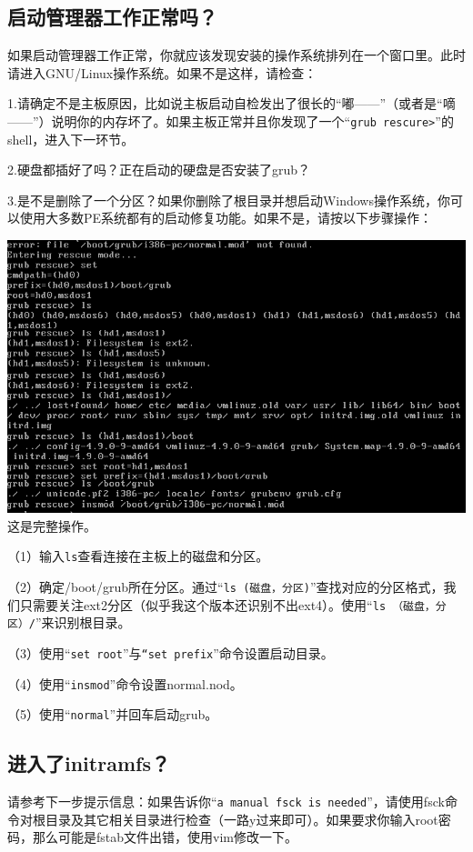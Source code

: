 \subsection{启动管理器工作正常吗？}
如果启动管理器工作正常，你就应该发现安装的操作系统排列在一个窗口里。此时请进入GNU/Linux操作系统。如果不是这样，请检查：\par
1.请确定不是主板原因，比如说主板启动自检发出了很长的“嘟——”（或者是“嘀——”）说明你的内存坏了。如果主板正常并且你发现了一个“\verb|grub rescure>|”的shell，进入下一环节。\par
2.硬盘都插好了吗？正在启动的硬盘是否安装了grub？\par
3.是不是删除了一个分区？如果你删除了根目录并想启动Windows操作系统，你可以使用大多数PE系统都有的启动修复功能。如果不是，请按以下步骤操作：
\begin{center}
	\includegraphics{pic/grubrescure}\\
	这是完整操作。
\end{center} \par
（1）输入\verb|ls|查看连接在主板上的磁盘和分区。\par
（2）确定/boot/grub所在分区。通过“\verb|ls (磁盘，分区)|”查找对应的分区格式，我们只需要关注ext2分区（似乎我这个版本还识别不出ext4）。使用“\verb|ls （磁盘，分区）/|”来识别根目录。\par
（3）使用“\verb|set root|”与\verb|“set prefix|”命令设置启动目录。\par
（4）使用“\verb|insmod|”命令设置normal.nod。\par
（5）使用“\verb|normal|”并回车启动grub。
\subsection{进入了initramfs？}
请参考下一步提示信息：如果告诉你“\verb|a manual fsck is needed|”，请使用fsck命令对根目录及其它相关目录进行检查（一路y过来即可）。如果要求你输入root密码，那么可能是fstab文件出错，使用vim修改一下。